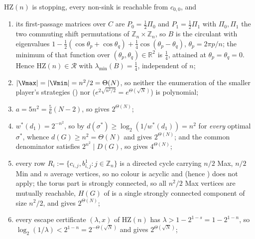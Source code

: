 \begin{proposition}\label{hz:ring-out}
$\mathrm{HZ}(n)$ is stopping, every non-sink is reachable from $c_{0,0}$, and
\begin{enumerate}[label=\textup{(\roman*)},leftmargin=2.4em]
\item its first-passage matrices over $C$ are
      $P_0=\tfrac12\Pi_0$ and $P_1=\tfrac12\Pi_1$ with $\Pi_0,\Pi_1$ the two
      commuting shift permutations of $\mathbb Z_n\times\mathbb Z_n$, so
      $B$ is the circulant with eigenvalues
      $1-\tfrac12(\cos\theta_p+\cos\theta_q)+\tfrac14\cos(\theta_p-\theta_q)$,
      $\theta_p=2\pi p/n$; the minimum of that function over
      $(\theta_p,\theta_q)\in\mathbb R^{2}$ is $\tfrac14$, attained at
      $\theta_p=\theta_q=0$. Hence $\mathrm{HZ}(n)\in\mathcal R$ with
      $\lambda_{\min}(B)=\tfrac14$, independent of $n$;
\item $|\Vmax|=|\Vmin|=n^{2}/2=\Theta(N)$, so neither the enumeration of the
      smaller player's strategies () nor
       ($e^{2\sqrt{n^{2}/2}}=e^{\Theta(\sqrt N)}$) is
      polynomial;
\item $a=5n^{2}=\tfrac56(N-2)$, so  gives $2^{\Theta(N)}$;
\item $w^\ast(d_1)=2^{-n^{2}}$, so by 
      $d(\sigma^{\ast})\ge\log_2(1/w^\ast(d_1))=n^{2}$ for \emph{every}
      optimal $\sigma^{\ast}$, whence $d(G)\ge n^{2}=\Theta(N)$ and
       gives $2^{\Theta(N)}$; and the common denominator
      satisfies $2^{n^{2}}\mid D(G)$, so  gives
      $4^{\Theta(N)}$;
\item every row $R_i:=\{c_{i,j},b^{1}_{i,j}:j\in\mathbb Z_n\}$ is a directed
      cycle carrying $n/2$ Max, $n/2$ Min and $n$ average vertices, so no
      colour is acyclic and  (hence
      ) does not apply;
      the torus part is strongly connected, so all $n^{2}/2$ Max vertices are
      mutually reachable, $H(G)$ of  is a single strongly
      connected component of size $n^{2}/2$, and
       gives $2^{\Theta(N)}$;
\item every escape certificate $(\lambda,x)$ of $\mathrm{HZ}(n)$ has
      $\lambda>1-2^{1-s}=1-2^{1-n}$, so
      $\log_2(1/\lambda)<2^{1-n}=2^{-\Theta(\sqrt N)}$ and
       gives $2^{\Theta(\sqrt N)}$;

\end{enumerate}
\end{proposition}
